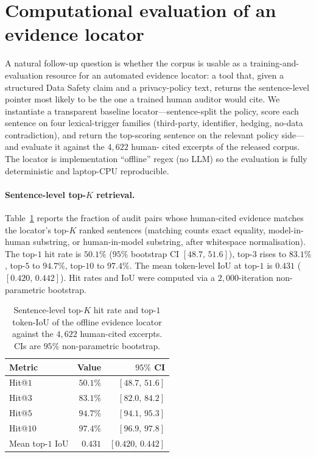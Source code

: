 \documentclass[11pt,a4paper]{article}
\begin{document}
\section{Computational evaluation of an evidence locator}
\label{sec:tooleval}
A natural follow-up question is whether the corpus is usable as a
training-and-evaluation resource for an automated evidence locator: a
tool that, given a structured Data Safety claim and a privacy-policy
text, returns the sentence-level pointer most likely to be the one a
trained human auditor would cite. We instantiate a transparent
baseline locator---sentence-split the policy, score each sentence on
four lexical-trigger families (third-party, identifier, hedging,
no-data contradiction), and return the top-scoring sentence on the
relevant policy side---and evaluate it against the $4{,}622$ human-
cited excerpts of the released corpus. The locator is implementation
``offline'' regex (no LLM) so the evaluation is fully deterministic
and laptop-CPU reproducible.

\paragraph{Sentence-level top-$K$ retrieval.}
Table~\ref{tab:topk} reports the fraction of audit pairs whose
human-cited evidence matches the locator's top-$K$ ranked sentences
(matching counts exact equality, model-in-human substring, or
human-in-model substring, after whitespace normalisation). The
top-$1$ hit rate is $50.1\%$ ($95\%$ bootstrap CI $[48.7,\,51.6]$),
top-$3$ rises to $83.1\%$, top-$5$ to $94.7\%$, top-$10$ to $97.4\%$.
The mean token-level IoU at top-$1$ is $0.431$ ($[0.420,\,0.442]$).
Hit rates and IoU were computed via a $2{,}000$-iteration
non-parametric bootstrap.

\begin{table}[t]
\centering\small
\caption{Sentence-level top-$K$ hit rate and top-$1$ token-IoU of the
offline evidence locator against the $4{,}622$ human-cited excerpts.
CIs are $95\%$ non-parametric bootstrap.}
\label{tab:topk}
\begin{tabular}{lrr}
\toprule
Metric & Value & $95\%$ CI \\
\midrule
Hit@$1$    & $50.1\%$ & $[48.7,\,51.6]$ \\
Hit@$3$    & $83.1\%$ & $[82.0,\,84.2]$ \\
Hit@$5$    & $94.7\%$ & $[94.1,\,95.3]$ \\
Hit@$10$   & $97.4\%$ & $[96.9,\,97.8]$ \\
Mean top-$1$ IoU & $0.431$ & $[0.420,\,0.442]$ \\
\bottomrule
\end{tabular}
\end{table}
\end{document}
